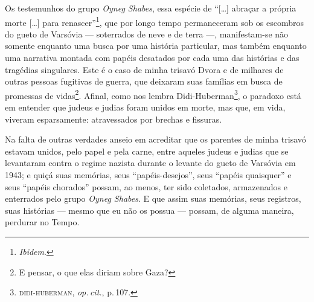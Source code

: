 Os testemunhos do grupo \emph{Oyneg Shabes}, essa espécie de
``{[}\ldots{}{]} abraçar a própria morte {[}\ldots{}{]} para
renascer''\footnote{\emph{Ibidem}.}, que por longo tempo permaneceram sob os
escombros do gueto de Varsóvia --- soterrados de neve e de terra ---,
manifestam-se não somente enquanto uma busca por uma história
particular, mas também enquanto uma narrativa montada com papéis
desatados por cada uma das histórias e das tragédias singulares. Este é
o caso de minha trisavó Dvora e de milhares de outras pessoas fugitivas
de guerra, que deixaram suas famílias em busca de promessas de
vidas\footnote{E pensar, o que elas diriam sobre Gaza?}. Afinal, como
nos lembra Didi-Huberman\footnote{\textsc{didi-huberman}, \emph{op.\,cit.}, p.\,107.}, o
paradoxo está em entender que judeus e judias foram unidos em morte, mas
que, em vida, viveram esparsamente: atravessados por brechas e fissuras.

Na falta de outras verdades anseio em acreditar que os parentes de minha
trisavó estavam unidos, pelo papel e pela carne, entre aqueles judeus e
judias que se levantaram contra o regime nazista durante o levante do
gueto de Varsóvia em 1943; e quiçá suas memórias, seus
``papéis-desejos'', seus ``papéis quaisquer'' e seus
``papéis chorados'' possam, ao menos, ter sido coletados,
armazenados e enterrados pelo grupo \emph{Oyneg Shabes}. E que assim
suas memórias, seus registros, suas histórias --- mesmo que eu não os
possua --- possam, de alguma maneira, perdurar no Tempo.

